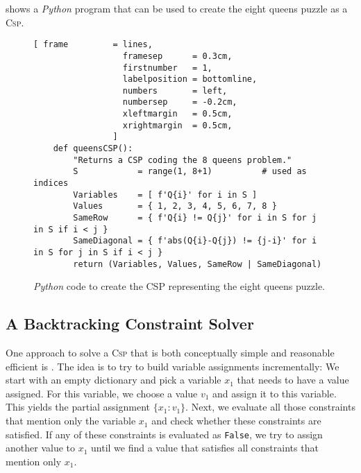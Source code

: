  shows a \textsl{Python} program that can be used to create the eight queens puzzle as a
\textsc{Csp}.  

\begin{figure}[!ht]
\centering
\begin{Verbatim}[ frame         = lines, 
                  framesep      = 0.3cm, 
                  firstnumber   = 1,
                  labelposition = bottomline,
                  numbers       = left,
                  numbersep     = -0.2cm,
                  xleftmargin   = 0.5cm,
                  xrightmargin  = 0.5cm,
                ]
    def queensCSP():
        "Returns a CSP coding the 8 queens problem."
        S            = range(1, 8+1)          # used as indices
        Variables    = [ f'Q{i}' for i in S ]
        Values       = { 1, 2, 3, 4, 5, 6, 7, 8 }
        SameRow      = { f'Q{i} != Q{j}' for i in S for j in S if i < j }
        SameDiagonal = { f'abs(Q{i}-Q{j}) != {j-i}' for i in S for j in S if i < j }
        return (Variables, Values, SameRow | SameDiagonal)
\end{Verbatim}
\vspace*{-0.3cm}
\caption{\textsl{Python} code to create the CSP representing the eight queens puzzle.}
\label{fig:queens-csp.stlx}
\end{figure}


\subsection{A Backtracking Constraint Solver}
One approach to solve a \textsc{Csp} that is both conceptually simple and reasonable efficient is
.  The idea is to try to build variable assignments incrementally:  We start with
an empty dictionary and pick a variable $x_1$ that needs to have a value assigned.  For this variable, we
choose a value $v_1$ and assign it to this variable.  This yields the partial assignment $\{ x_1:v_1 \}$.
Next, we evaluate all those constraints that mention only the variable $x_1$ and check whether these constraints
are satisfied.  If any of these constraints is evaluated as \texttt{False}, we try to assign another value to
$x_1$ until we find a value that satisfies all constraints that mention only $x_1$.

